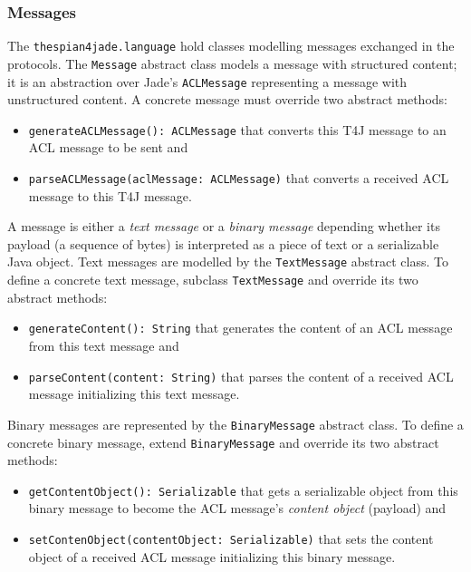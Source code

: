 \subsubsection{Messages}

The \texttt{thespian4jade.language} hold classes modelling messages exchanged in the protocols.
The \texttt{Message} abstract class models a message with structured content; it is an abstraction over Jade's \texttt{ACLMessage} representing a message with unstructured content.
A concrete message must override two abstract methods:
\begin{itemize}
	\item \texttt{generateACLMessage(): ACLMessage} that converts this T4J message to an ACL message to be sent and
	\item \texttt{parseACLMessage(aclMessage: ACLMessage)} that converts a received ACL message to this T4J message.
\end{itemize}
A message is either a \textit{text message} or a \textit{binary message} depending whether its payload (a sequence of bytes) is interpreted as a piece of text or a serializable Java object.
Text messages are modelled by the \texttt{TextMessage} abstract class.
To define a concrete text message, subclass \texttt{TextMessage} and override its two abstract methods:
\begin{itemize}
	\item \texttt{generateContent(): String} that generates the content of an ACL message from this text message and
	\item \texttt{parseContent(content: String)} that parses the content of a received ACL message initializing this text message. 
\end{itemize}
Binary messages are represented by the \texttt{BinaryMessage} abstract class.
To define a concrete binary message, extend \texttt{BinaryMessage} and override its two abstract methods:
\begin{itemize}
	\item \texttt{getContentObject(): Serializable} that gets a serializable object from this binary message to become the ACL message's \textit{content object} (payload) and
	\item \texttt{setContenObject(contentObject: Serializable)} that sets the content object of a received ACL message initializing this binary message.
\end{itemize}

